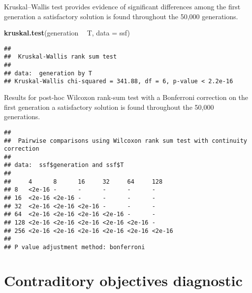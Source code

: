 \documentclass[]{book}
\newenvironment{Shaded}{\begin{snugshade}}{\end{snugshade}}
\newcommand{\DataTypeTok}[1]{\textcolor[rgb]{0.13,0.29,0.53}{#1}}
\newcommand{\KeywordTok}[1]{\textcolor[rgb]{0.13,0.29,0.53}{\textbf{#1}}}
\newcommand{\NormalTok}[1]{#1}
\newcommand{\OperatorTok}[1]{\textcolor[rgb]{0.81,0.36,0.00}{\textbf{#1}}}
\newcommand{\OtherTok}[1]{\textcolor[rgb]{0.56,0.35,0.01}{#1}}
\newcommand{\StringTok}[1]{\textcolor[rgb]{0.31,0.60,0.02}{#1}}
\begin{document}
Kruskal--Wallis test provides evidence of significant differences among the first generation a satisfactory solution is found throughout the 50,000 generations.

\begin{Shaded}
\begin{Highlighting}[]
\KeywordTok{kruskal.test}\NormalTok{(generation }\OperatorTok{~}\StringTok{ }\NormalTok{T, }\DataTypeTok{data =}\NormalTok{ ssf)}
\end{Highlighting}
\end{Shaded}

\begin{verbatim}
## 
##  Kruskal-Wallis rank sum test
## 
## data:  generation by T
## Kruskal-Wallis chi-squared = 341.88, df = 6, p-value < 2.2e-16
\end{verbatim}

Results for post-hoc Wilcoxon rank-sum test with a Bonferroni correction on the first generation a satisfactory solution is found throughout the 50,000 generations.

\begin{Shaded}
\end{Shaded}

\begin{verbatim}
## 
##  Pairwise comparisons using Wilcoxon rank sum test with continuity correction 
## 
## data:  ssf$generation and ssf$T 
## 
##     4      8      16     32     64     128   
## 8   <2e-16 -      -      -      -      -     
## 16  <2e-16 <2e-16 -      -      -      -     
## 32  <2e-16 <2e-16 <2e-16 -      -      -     
## 64  <2e-16 <2e-16 <2e-16 <2e-16 -      -     
## 128 <2e-16 <2e-16 <2e-16 <2e-16 <2e-16 -     
## 256 <2e-16 <2e-16 <2e-16 <2e-16 <2e-16 <2e-16
## 
## P value adjustment method: bonferroni
\end{verbatim}

\hypertarget{contraditory-objectives-diagnostic}{%
\section{Contraditory objectives diagnostic}\label{contraditory-objectives-diagnostic}}
\end{document}

